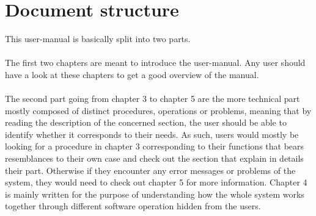 \section{Document structure}  
This user-manual is basically split into two parts. \\\\
The first two chapters are meant to introduce the user-manual. Any user should
have a look at these chapters to get a good overview of the manual. \\\\
The second part going from chapter 3 to chapter 5 are the more technical
part mostly composed of distinct procedures, operations or problems, meaning
that by reading the description of the concerned section, the user should be
able to identify whether it corresponds to their needs. As such, users would
mostly be looking for a procedure in chapter 3 corresponding to their functions
that bears resemblances to their own case and check out the section that
explain in details their part. Otherwise if they encounter any error messages or
problems of the system, they would need to check out chapter 5 for more
information.
Chapter 4 is mainly written for the purpose of understanding how the whole
system works together through different software operation hidden from the
users.





